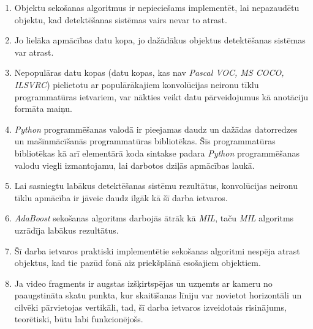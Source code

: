 \begin{enumerate}
	\item Objektu sekošanas algoritmus ir nepieciešams implementēt, lai nepazaudētu objektu, kad detektēšanas sistēmas vairs nevar to atrast.
	\item Jo lielāka apmācības datu kopa, jo dažādākus objektus detektēšanas sistēmas var atrast.
	\item Nepopulāras datu kopas (datu kopas, kas nav \textit{Pascal VOC, MS COCO, ILSVRC}) pielietotu ar populārākajiem konvolūcijas neironu tīklu programmatūras ietvariem, var nākties veikt datu pārveidojumus kā anotāciju formāta maiņu.
	\item \textit{Python} programmēšanas valodā ir pieejamas daudz un dažādas datorredzes un mašīnmācīšanās programmatūras bibliotēkas. Šīs programmatūras bibliotēkas kā arī elementārā koda sintakse padara \textit{Python} programmēšanas valodu viegli izmantojamu, lai darbotos dziļās apmācības laukā.
	\item Lai sasniegtu labākus detektēšanas sistēmu rezultātus, konvolūcijas neironu tīklu apmācība ir jāveic daudz ilgāk kā šī darba ietvaros.
	\item \textit{AdaBoost} sekošanas algoritms darbojās ātrāk kā \textit{MIL}, taču \textit{MIL} algoritms uzrādīja labākus rezultātus.
	\item Šī darba ietvaros praktiski implementētie sekošanas algoritmi nespēja atrast objektus, kad tie pazūd fonā aiz priekšplānā esošajiem objektiem.
	\item Ja video fragments ir augstas izšķirtspējas un uzņemts ar kameru no paaugstināta skatu punkta, kur skaitīšanas līniju var novietot horizontāli un cilvēki pārvietojas vertikāli, tad, šī darba ietvaros izveidotais risinājums, teorētiski, būtu labi funkcionējošs.
\end{enumerate}
